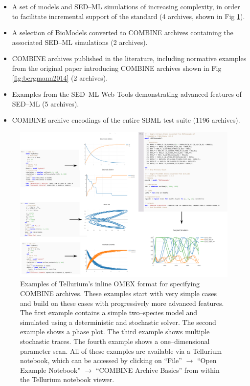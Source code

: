 \documentclass[10pt,letterpaper]{article}
\begin{document}

\begin{itemize}
\item A set of models and SED--ML simulations of increasing complexity, in order to facilitate incremental support of the standard (4 archives, shown in Fig \ref{fig:inlineomex}).
\item A selection of BioModels converted to COMBINE archives containing the associated SED--ML simulations (2 archives).
\item COMBINE archives published in the literature, including normative examples from the original paper introducing COMBINE archives \cite{bergmann2014combine} shown in Fig \ref{fig:bergmann2014} (2 archives).
\item Examples from the SED--ML Web Tools \cite{bergmann2017sed} demonstrating advanced features of SED--ML (5 archives).
\item COMBINE archive encodings of the entire SBML test suite (1196 archives).
\end{itemize}

\begin{figure}
  \includegraphics[width=1.0\textwidth]{fig-inline-omex.pdf}
  \caption{Examples of Tellurium's inline OMEX format for specifying COMBINE archives. These examples start with very simple cases and build on these cases with progressively more advanced features. The first example contains a simple two--species model and simulated using a deterministic and stochastic solver. The second example shows a phase plot. The third example shows multiple stochastic traces. The fourth example shows a one--dimensional parameter scan. All of these examples are available via a Tellurium notebook, which can be accessed by clicking on ``File'' $\rightarrow$ ``Open Example Notebook'' $\rightarrow$ ``COMBINE Archive Basics'' from within the Tellurium notebook viewer. }
  \label{fig:inlineomex}
\end{figure}
\end{document}
